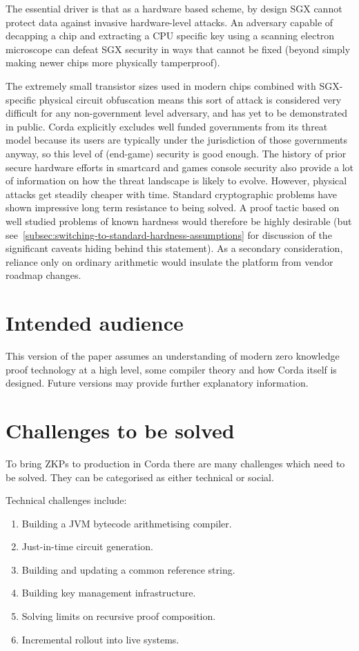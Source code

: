 \documentclass{article}
\begin{document}
The essential driver is that as a hardware based scheme, by design SGX cannot protect data against invasive
hardware-level attacks. An adversary capable of decapping a chip and extracting a CPU specific key using a scanning
electron microscope can defeat SGX security in ways that cannot be fixed (beyond simply making newer chips more
physically tamperproof).

The extremely small transistor sizes used in modern chips combined with SGX-specific physical circuit obfuscation
means this sort of attack is considered very difficult for any non-government level adversary, and has yet to be
demonstrated in public. Corda explicitly excludes well funded governments from its threat model because its users
are typically under the jurisdiction of those governments anyway, so this level of (end-game) security is good
enough. The history of prior secure hardware efforts in smartcard and games console security also provide a lot of
information on how the threat landscape is likely to evolve. However, physical attacks get steadily cheaper with
time. Standard cryptographic problems have shown impressive long term resistance to being solved. A proof tactic
based on well studied problems of known hardness would therefore be highly desirable (but
see~\cref{subsec:switching-to-standard-hardness-assumptions} for discussion of the significant caveats hiding
behind this statement). As a secondary consideration, reliance only on ordinary arithmetic would insulate the
platform from vendor roadmap changes.

\section{Intended audience}

This version of the paper assumes an understanding of modern zero knowledge proof technology at a high level, some
compiler theory and how Corda itself is designed. Future versions may provide further explanatory information.

\section{Challenges to be solved}

To bring ZKPs to production in Corda there are many challenges which need to be solved. They can be categorised
as either technical or social.

Technical challenges include:

\begin{enumerate}
    \item Building a JVM bytecode arithmetising compiler.
    \item Just-in-time circuit generation.
    \item Building and updating a common reference string.
    \item Building key management infrastructure.
    \item Solving limits on recursive proof composition.
    \item Incremental rollout into live systems.
\end{enumerate}
\end{document}
